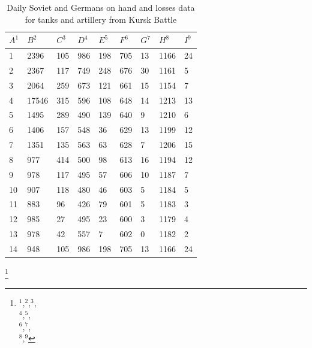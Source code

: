 \documentclass[]{article}
\begin{document}
\begin{table}
 
\centering
\tiny
\caption{Daily Soviet and Germans on hand and losses data for tanks and artillery from Kursk Battle}
\tiny

{\begin{tabular}{|p{.1cm}|p{.5cm}|p{.3cm}|p{.3cm}|p{.3cm}|p{.3cm}|p{.2cm}|p{.4cm}|p{.2cm}|} 
\hline
\centering

$A^1$ & $B^2$ & $C^3$	& $D^4$	& $E^5$ & $F^6$	& $G^7$ & $H^8$	& $I^9$ \\
\hline
1&2396&105&986&198&705&13&1166&24\\
\hline
2&2367&117&749&248&676&30&1161&5\\
\hline
3&2064&259&673&121&661&15&1154&7\\
\hline
4&17546&315&596&108&648&14&1213&13\\
\hline
5&1495&289&490&139&640&9&1210&6\\
\hline
6&1406&157&548&36&629&13&1199&12\\
\hline
7&1351&135&563&63&628&7&1206&15\\
\hline
8&977&414&500&98&613&16&1194&12\\
\hline
9&978&117&495&57&606&10&1187&7\\
\hline
10&907&118&480&46&603&5&1184&5\\
\hline
11&883&96&426&79&601&5&1183&3\\
\hline
12&985&27&495&23&600&3&1179&4\\
\hline
13&978&42&557&7&602&0&1182&2\\
\hline
14&948&105&986&198&705&13&1166&24\\
\hline
\end{tabular}}%
\tiny
{\footnote{$^1$,$^2$,$^3$,\\$^4$,$^5$,\\$^6$,$^7$,\\$^8$,$^9$}}\\
\end{table}
\end{document}
